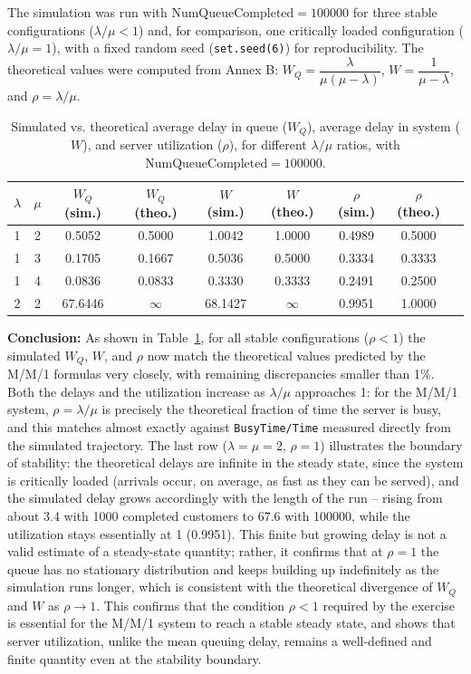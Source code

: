 \documentclass[12pt]{article}
\begin{document}
The simulation was run with $\text{NumQueueCompleted}=100000$ for three stable configurations ($\lambda/\mu<1$) and, for comparison, one critically loaded configuration ($\lambda/\mu=1$), with a fixed random seed (\texttt{set.seed(6)}) for reproducibility. The theoretical values were computed from Annex B: $W_Q = \dfrac{\lambda}{\mu(\mu-\lambda)}$, $W = \dfrac{1}{\mu-\lambda}$, and $\rho = \lambda/\mu$.

\begin{table}[H]
\centering
\begin{tabular}{|c|c|c|c|c|c|c|c|c|}
\hline
$\lambda$ & $\mu$ & $W_Q$ (sim.) & $W_Q$ (theo.) & $W$ (sim.) & $W$ (theo.) & $\rho$ (sim.) & $\rho$ (theo.) \\
\hline
1 & 2 & 0.5052 & 0.5000 & 1.0042 & 1.0000 & 0.4989 & 0.5000 \\
1 & 3 & 0.1705 & 0.1667 & 0.5036 & 0.5000 & 0.3334 & 0.3333 \\
1 & 4 & 0.0836 & 0.0833 & 0.3330 & 0.3333 & 0.2491 & 0.2500 \\
\hline
2 & 2 & 67.6446 & $\infty$ & 68.1427 & $\infty$ & 0.9951 & 1.0000 \\
\hline
\end{tabular}
\caption{Simulated vs. theoretical average delay in queue ($W_Q$), average delay in system ($W$), and server utilization ($\rho$), for different $\lambda/\mu$ ratios, with $\text{NumQueueCompleted}=100000$.}
\label{tab:ex6_results}
\end{table}

\textbf{Conclusion:} As shown in Table~\ref{tab:ex6_results}, for all stable configurations ($\rho<1$) the simulated $W_Q$, $W$, and $\rho$ now match the theoretical values predicted by the M/M/1 formulas very closely, with remaining discrepancies smaller than 1\%. Both the delays and the utilization increase as $\lambda/\mu$ approaches 1: for the M/M/1 system, $\rho=\lambda/\mu$ is precisely the theoretical fraction of time the server is busy, and this matches almost exactly against \texttt{BusyTime/Time} measured directly from the simulated trajectory. The last row ($\lambda=\mu=2$, $\rho=1$) illustrates the boundary of stability: the theoretical delays are infinite in the steady state, since the system is critically loaded (arrivals occur, on average, as fast as they can be served), and the simulated delay grows accordingly with the length of the run -- rising from about 3.4 with 1000 completed customers to 67.6 with 100000, while the utilization stays essentially at 1 (0.9951). This finite but growing delay is not a valid estimate of a steady-state quantity; rather, it confirms that at $\rho=1$ the queue has no stationary distribution and keeps building up indefinitely as the simulation runs longer, which is consistent with the theoretical divergence of $W_Q$ and $W$ as $\rho\to1$. This confirms that the condition $\rho<1$ required by the exercise is essential for the M/M/1 system to reach a stable steady state, and shows that server utilization, unlike the mean queuing delay, remains a well-defined and finite quantity even at the stability boundary.
\end{document}
